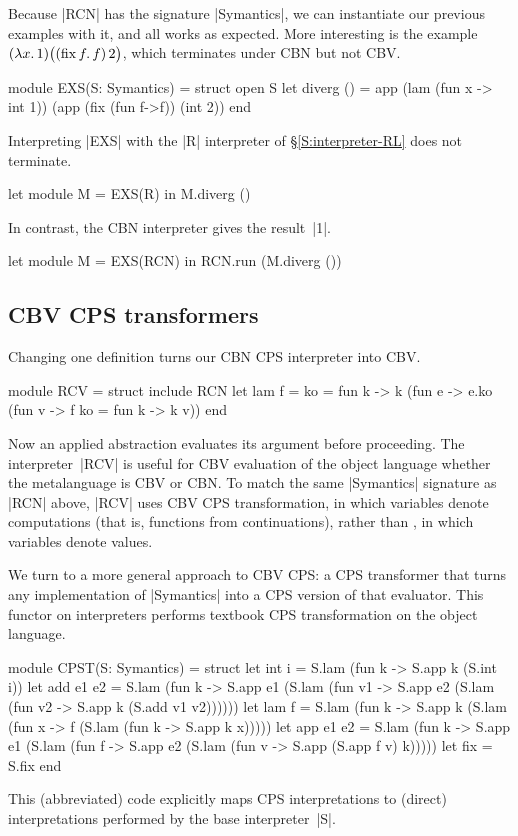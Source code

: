 Because |RCN| has the signature |Symantics|, we can instantiate our previous
examples with it, and all works as expected.  More interesting
is the example $(\mathopen{\lambda\mathord{x}.\,}1)\bigl((\mathopen{\mathrm{fix\,}\mathord{f}.\,}f)\mathinner2\bigr)$, which terminates
under CBN but not CBV\@.
\begin{code}
module EXS(S: Symantics) = struct open S
 let diverg () = app (lam (fun x -> int 1)) 
                     (app (fix (fun f->f)) (int 2))
end
\end{code}
Interpreting |EXS| with the |R| interpreter of
\S\ref{S:interpreter-RL} does not terminate.
\begin{code}
let module M = EXS(R) in M.diverg ()
\end{code}
In contrast, the CBN interpreter gives the result~|1|.
\begin{code}
let module M = EXS(RCN) in RCN.run (M.diverg ())
\end{code}

\subsection{CBV CPS transformers}

Changing one definition turns our CBN CPS interpreter into CBV\@.
\begin{code}
module RCV = struct include RCN
  let lam f = {ko = fun k -> k
      (fun e -> e.ko (fun v -> f {ko = fun k -> k v}))}
end
\end{code}
Now an applied abstraction
evaluates its argument before proceeding.  The
interpreter~|RCV| is useful for CBV evaluation of the object language
whether the metalanguage is CBV or CBN\@.
To match the same |Symantics| signature as |RCN| above, |RCV| uses
 CBV CPS transformation, in which variables
denote computations (that is, functions from continuations),
rather than , in which variables denote values.

We turn to a more general approach to CBV CPS: a CPS transformer that
turns any implementation of |Symantics| into a CPS version of that
evaluator.
This functor on interpreters performs  textbook
CPS transformation on the object language.
\begin{code}
module CPST(S: Symantics) = struct
  let int i = S.lam (fun k -> S.app k (S.int i))
  let add e1 e2 = S.lam (fun k -> S.app e1 (S.lam (fun v1 ->
                                  S.app e2 (S.lam (fun v2 ->
                                  S.app k (S.add v1 v2))))))
  let lam f = S.lam (fun k -> S.app k
              (S.lam (fun x -> f (S.lam (fun k -> S.app k x)))))
  let app e1 e2 = S.lam (fun k -> S.app e1 (S.lam (fun f ->
                                  S.app e2 (S.lam (fun v ->
                                  S.app (S.app f v) k)))))
  let fix = S.fix
end
\end{code}
This (abbreviated) code explicitly maps CPS interpretations to
(direct) interpretations performed by 
the base interpreter~|S|.

